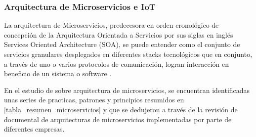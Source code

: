 \documentclass[stu,12pt,floatsintext]{apa7}
\begin{document}
	
	
	
	\subsubsection{Arquitectura de Microservicios e IoT}
	La arquitectura de Microservicios, predecesora en orden cronológico de concepción de la Arquitectura Orientada a Servicios por sus siglas en inglés Services Oriented Architecture (SOA), se puede entender como el conjunto de servicios granulares desplegados en diferentes stacks tecnológicos que en conjunto, a través de uno o varios protocolos de comunicación, logran interacción en beneficio de un sistema o software \cite{WASEEM2020110798}.
	
	En el estudio de \cite{10220070} sobre arquitectura de microservicios, se encuentran identificadas unas series de practicas, patrones y principios resumidos en \ref{tabla_resumen_microservicios} y que se dedujeron a través de la revisión de documental de arquitecturas de microservicios implementadas por parte de diferentes empresas.
	
\end{document}
